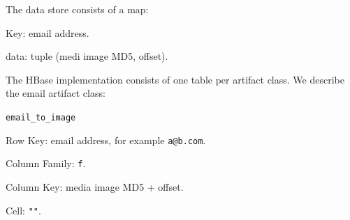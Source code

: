\documentclass[12pt,twoside]{article}
\begin{document}
The data store consists of a map:
\begin{compactitem}
\item Key: email address.
\item data: tuple (medi image MD5, offset).
\end{compactitem}

The HBase implementation consists of one table per artifact class. We describe the email artifact class:
\begin{compactitem}
\item \verb+email_to_image+
  \begin{compactitem}
  \item Row Key: email address, for example \verb+a@b.com+.
  \item Column Family: \verb+f+.
  \item Column Key: media image MD5 + offset.
  \item Cell: \verb+""+.
  \end{compactitem}
\end{compactitem}
\end{document}

